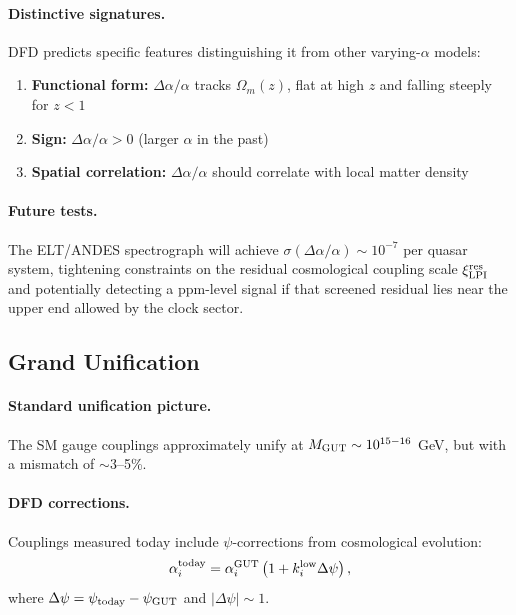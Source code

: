 \paragraph{Distinctive signatures.}
DFD predicts specific features distinguishing it from other varying-$\alpha$ models:
\begin{enumerate}
\item \textbf{Functional form:} $\Delta\alpha/\alpha$ tracks $\Omega_m(z)$, flat at high $z$ and falling steeply for $z < 1$
\item \textbf{Sign:} $\Delta\alpha/\alpha > 0$ (larger $\alpha$ in the past)
\item \textbf{Spatial correlation:} $\Delta\alpha/\alpha$ should correlate with local matter density
\end{enumerate}

\paragraph{Future tests.}
The ELT/ANDES spectrograph will achieve $\sigma(\Delta\alpha/\alpha) \sim 10^{-7}$ per quasar system, tightening constraints on the residual cosmological coupling scale $\xi_{\rm LPI}^{\rm res}$ and potentially detecting a ppm-level signal if that screened residual lies near the upper end allowed by the clock sector.

\subsection{Grand Unification}\label{sec:gauge-gut}

\paragraph{Standard unification picture.}
The SM gauge couplings approximately unify at $M_{\rm GUT} \sim 10^{15-16}$ GeV, but with a mismatch of $\sim 3$--5\%.

\paragraph{DFD corrections.}
Couplings measured today include $\psi$-corrections from cosmological evolution:
\begin{equation}
\alpha_i^{\rm today} = \alpha_i^{\rm GUT}\left(1 + k_i^{\rm low}\Delta\psi\right),
\end{equation}
where $\Delta\psi = \psi_{\rm today} - \psi_{\rm GUT}$ and $|\Delta\psi| \sim 1$.

